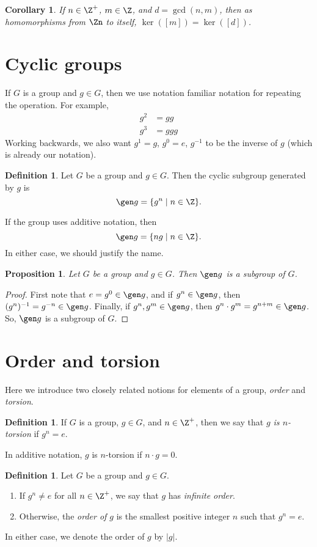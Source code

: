 \documentclass[12pt]{amsart}
\newcommand{\terminology}[1]{\textbf{\textit{#1}}}
\renewcommand{\terminology}[1]{#1}
\newcommand{\term}{\terminology}
\theoremstyle{plain}
\newtheorem{prop}[thm]{Proposition}
\newtheorem{cor}[thm]{Corollary}
\theoremstyle{definition}
\newtheorem{defn}[thm]{Definition}
\theoremstyle{remark}
\begin{document}
\begin{cor} \label{znkernels}
  If $n\in\Z^+$, $m\in\Z$, and $d=\gcd(n,m)$,  then as homomorphisms
  from $\Zn$ to itself, $\ker([m]) = \ker([d])$.
\end{cor}


\section{Cyclic groups}
If $G$ is a group and $g\in G$, then we use notation familiar notation
for repeating the operation.  For example,
\begin{align*}
g^2 &= gg\\
g^3&= ggg
\end{align*}
Working backwards, we also want $g^1=g$, $g^0=e$, $g^{-1}$ to be the
inverse of $g$ (which is already our notation).


\begin{defn}
  Let $G$ be a group and $g\in G$.  Then the \term{cyclic subgroup}
    generated by $g$ is
  \[ \gen g = \{ g^n\mid n\in\Z\}.\]
\end{defn}
If the group uses additive notation, then
\[ \gen g = \{ng\mid n\in\Z\}.\]
In either case, we should justify the name.
\begin{prop}
  Let $G$ be a group and $g\in G$.  Then $\gen g$ is a subgroup of $G$.
\end{prop}
\begin{proof}
  First note that $e=g^0\in \gen g$, and if $g^n\in\gen g$, then
  $(g^n)^{-1} = g^{-n}\in \gen g$.  Finally, if $g^n,g^m\in \gen g$,
  then $g^n\cdot g^m=g^{n+m}\in \gen g$.  So, $\gen g$ is a subgroup
  of $G$.
\end{proof}

\section{Order and torsion}
Here we introduce two closely related notions for elements of a group, \emph{order}
and \emph{torsion}.

\begin{defn}
If $G$ is a group, $g\in G$, and $n\in\Z^+$, then we say that \emph{$g$ is $n$-torsion}
if $g^n=e$.
\end{defn}
In additive notation, $g$ is $n$-torsion if $n\cdot g=0$.

\begin{defn}
  Let $G$ be a group and $g\in G$.
  \begin{enumerate}
  \item If $g^n\neq e$ for all $n\in\Z^+$, we say that $g$ has \emph{infinite order}.
  \item Otherwise, the \emph{order of $g$} is the smallest positive integer $n$ such that
  $g^n=e$.
  \end{enumerate}
  In either case, we denote the order of $g$ by $|g|$.
\end{defn}
\end{document}
